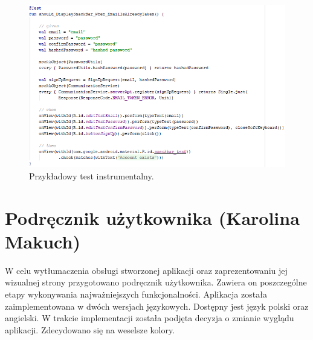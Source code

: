 \documentclass[10pt,twoside,a4paper]{report}
\begin{document}
\begin{figure}[h]
\centering
\includegraphics[width=\linewidth]{instrumentationTest}
\caption{Przykładowy test instrumentalny.}
\label{fig:instrumentationTest}
\end{figure}


\chapter{Podręcznik użytkownika (Karolina Makuch)}
\par W celu wytłumaczenia obsługi stworzonej aplikacji oraz zaprezentowaniu jej wizualnej strony przygotowano podręcznik użytkownika. Zawiera on poszczególne etapy wykonywania najważniejszych funkcjonalności.
Aplikacja została zaimplementowana w dwóch wersjach językowych. Dostępny jest język polski oraz angielski.
W trakcie implementacji została podjęta decyzja o zmianie wyglądu aplikacji. Zdecydowano się na weselsze kolory.
\end{document}
